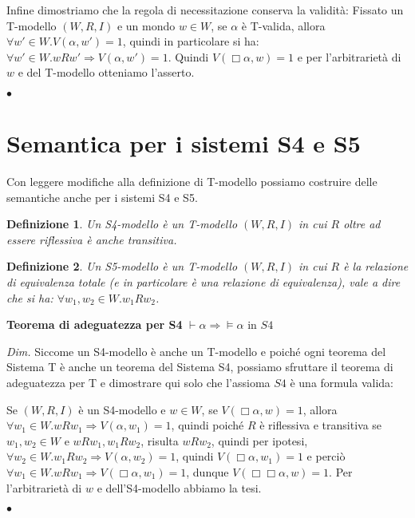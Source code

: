 \documentclass[a4paper, titlepage, 12pt]{report}
\newtheorem{definition}{Definizione}[chapter]
\begin{document}
\begin{flushleft}
Infine dimostriamo che la regola di necessitazione conserva la validità:
Fissato un T-modello $(W, R, I)$ e un mondo $w \in W$,
se $\alpha$ è T-valida, allora $\forall w' \in W.V(\alpha, w') = 1$,
quindi in particolare si ha: $\forall w' \in W. wRw' \Rightarrow V(\alpha, w') = 1$.
Quindi $V(\Box \alpha, w) = 1$ e per l'arbitrarietà di $w$ e del T-modello otteniamo l'asserto.


\begin{flushright}
$\bullet$
\end{flushright}
\end{flushleft}

\section{Semantica per i sistemi S4 e S5}
Con leggere modifiche alla definizione di T-modello possiamo costruire delle semantiche
anche per i sistemi S4 e S5.

\begin{definition}
Un S4-modello è un T-modello $(W, R, I)$ in cui $R$ oltre ad essere riflessiva è anche transitiva.
\end{definition}

\begin{definition}
Un S5-modello è un T-modello $(W, R, I)$ in cui $R$ è la relazione di equivalenza totale
(e in particolare è una relazione di equivalenza),
vale a dire che si ha: $\forall w_1, w_2 \in W. w_1 R w_2$.
\end{definition}

\begin{flushleft}
\textbf{Teorema di adeguatezza per S4}
$\vdash \alpha \Rightarrow \vDash \alpha$ in $S4$

\textit{Dim.}
Siccome un S4-modello è anche un T-modello e poiché ogni teorema del Sistema T
è anche un teorema del Sistema S4, possiamo sfruttare il teorema di adeguatezza per T
e dimostrare qui solo che l'assioma $S4$ è una formula valida:

Se $(W, R, I)$ è un S4-modello e $w \in W$,
se $V(\Box \alpha, w) = 1$, allora $\forall w_1 \in W. wRw_1 \Rightarrow V(\alpha, w_1) = 1$,
quindi poiché $R$ è riflessiva e transitiva
se $w_1, w_2 \in W$ e $wRw_1, w_1Rw_2$, risulta $wRw_2$, quindi per ipotesi,
$\forall w_2 \in W. w_1Rw_2 \Rightarrow V(\alpha, w_2) = 1$, quindi $V(\Box \alpha, w_1) = 1$
e perciò $\forall w_1 \in W. wRw_1 \Rightarrow V(\Box \alpha, w_1) = 1$,
dunque $V(\Box \Box \alpha, w) = 1$.
Per l'arbitrarietà di $w$ e dell'S4-modello abbiamo la tesi.


\begin{flushright}
$\bullet$
\end{flushright}
\end{flushleft}
\end{document}

